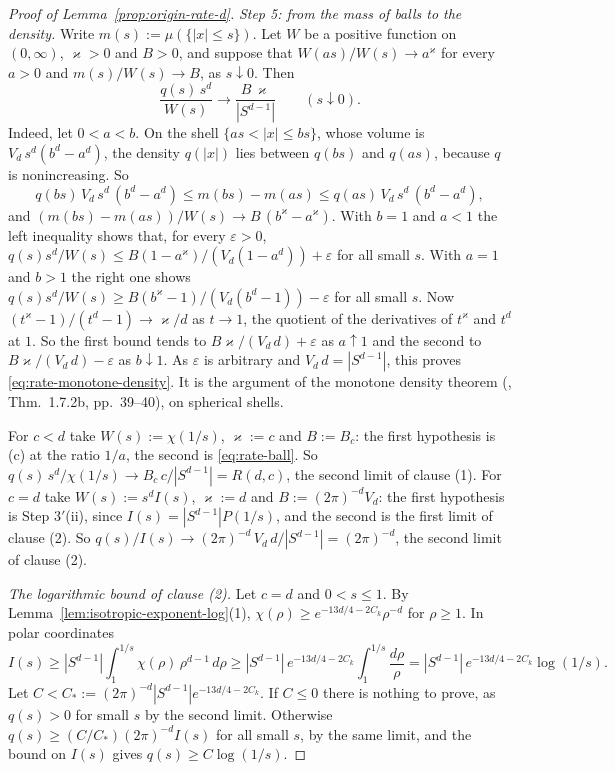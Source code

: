 \begin{proof}[Proof of Lemma~\ref{prop:origin-rate-d}]
\emph{Step 5: from the mass of balls to the density.} Write $m(s) := \mu(\{|x| \le s\})$. Let
$W$ be a positive function on $(0,\infty)$, $\varkappa > 0$ and $B > 0$, and suppose that
$W(as)/W(s) \to a^{\varkappa}$ for every $a > 0$ and $m(s)/W(s) \to B$, as $s \downarrow 0$. Then
\begin{equation}\label{eq:rate-monotone-density}
  \frac{q(s)\,s^{d}}{W(s)} \to \frac{B\,\varkappa}{|S^{d-1}|} \qquad (s \downarrow 0) .
\end{equation}
Indeed, let $0 < a < b$. On the shell $\{as < |x| \le bs\}$, whose volume is
$V_d\,s^{d}(b^{d} - a^{d})$, the density $q(|x|)$ lies between $q(bs)$ and $q(as)$, because $q$ is
nonincreasing. So
\[
  q(bs)\,V_d\,s^{d}\,(b^{d} - a^{d}) \le m(bs) - m(as) \le q(as)\,V_d\,s^{d}\,(b^{d} - a^{d}) ,
\]
and $(m(bs) - m(as))/W(s) \to B\,(b^{\varkappa} - a^{\varkappa})$. With $b = 1$ and $a < 1$ the left
inequality shows that, for every $\varepsilon > 0$, $q(s)s^{d}/W(s) \le
B(1 - a^{\varkappa})/(V_d(1 - a^{d})) + \varepsilon$ for all small $s$. With $a = 1$ and $b > 1$ the
right one shows $q(s)s^{d}/W(s) \ge B(b^{\varkappa} - 1)/(V_d(b^{d} - 1)) - \varepsilon$ for all small
$s$. Now $(t^{\varkappa} - 1)/(t^{d} - 1) \to \varkappa/d$ as $t \to 1$, the quotient of the
derivatives of $t^{\varkappa}$ and $t^{d}$ at $1$. So the first bound tends to
$B\varkappa/(V_d\,d) + \varepsilon$ as $a \uparrow 1$ and the second to
$B\varkappa/(V_d\,d) - \varepsilon$ as $b \downarrow 1$. As $\varepsilon$ is arbitrary and
$V_d\,d = |S^{d-1}|$, this proves \ref{eq:rate-monotone-density}. It is the argument of the
monotone density theorem (, Thm.~1.7.2b, pp.~39--40), on spherical
shells.

For $c < d$ take $W(s) := \chi(1/s)$, $\varkappa := c$ and $B := B_c$: the first hypothesis is (c)
at the ratio $1/a$, the second is \ref{eq:rate-ball}. So
$q(s)\,s^{d}/\chi(1/s) \to B_c\,c/|S^{d-1}| = R(d,c)$, the second limit of clause (1). For $c = d$
take $W(s) := s^{d}I(s)$, $\varkappa := d$ and $B := (2\pi)^{-d}V_d$: the first hypothesis is
Step 3$'$(ii), since $I(s) = |S^{d-1}|P(1/s)$, and the second is the first limit of clause (2).
So $q(s)/I(s) \to (2\pi)^{-d}\,V_d\,d/|S^{d-1}| = (2\pi)^{-d}$, the second limit of clause (2).

\emph{The logarithmic bound of clause (2).} Let $c = d$ and $0 < s \le 1$. By
Lemma~\ref{lem:isotropic-exponent-log}(1), $\chi(\rho) \ge e^{-13d/4 - 2C_k}\rho^{-d}$ for $\rho \ge 1$.
In polar coordinates
\[
  I(s) \ge |S^{d-1}|\int_1^{1/s}\chi(\rho)\,\rho^{d-1}\,d\rho
   \ge |S^{d-1}|\,e^{-13d/4 - 2C_k}\int_1^{1/s}\frac{d\rho}{\rho}
   = |S^{d-1}|\,e^{-13d/4 - 2C_k}\log(1/s) .
\]
Let $C < C_* := (2\pi)^{-d}|S^{d-1}|e^{-13d/4-2C_k}$. If $C \le 0$ there is nothing to prove, as
$q(s) > 0$ for small $s$ by the second limit. Otherwise $q(s) \ge (C/C_*)(2\pi)^{-d}I(s)$ for all
small $s$, by the same limit, and the bound on $I(s)$ gives $q(s) \ge C\log(1/s)$.
\end{proof}

